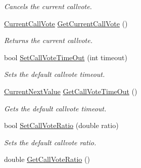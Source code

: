 \begin{DoxyCompactItemize}
\begin{DoxyCompactList}\small\item\em Cancels the current callvote. \end{DoxyCompactList}\item 
\hypertarget{classMethods_a8d457dcbd12a94aaf5d9913210e0862d}{\hyperlink{structCurrentCallVote}{Current\-Call\-Vote} \hyperlink{classMethods_a8d457dcbd12a94aaf5d9913210e0862d}{Get\-Current\-Call\-Vote} ()}\label{classMethods_a8d457dcbd12a94aaf5d9913210e0862d}

\begin{DoxyCompactList}\small\item\em Returns the current callvote. \end{DoxyCompactList}\item 
bool \hyperlink{classMethods_a9aaf00756eb3ee0e0a28e0c428bcc92d}{Set\-Call\-Vote\-Time\-Out} (int timeout)
\begin{DoxyCompactList}\small\item\em Sets the default callvote timeout. \end{DoxyCompactList}\item 
\hypertarget{classMethods_ac3ce6c4a44f8848c91395dc17c63a06f}{\hyperlink{structCurrentNextValue}{Current\-Next\-Value} \hyperlink{classMethods_ac3ce6c4a44f8848c91395dc17c63a06f}{Get\-Call\-Vote\-Time\-Out} ()}\label{classMethods_ac3ce6c4a44f8848c91395dc17c63a06f}

\begin{DoxyCompactList}\small\item\em Gets the default callvote timeout. \end{DoxyCompactList}\item 
bool \hyperlink{classMethods_a8e74a855649f8d1608fa8d873779189b}{Set\-Call\-Vote\-Ratio} (double ratio)
\begin{DoxyCompactList}\small\item\em Sets the default callvote ratio. \end{DoxyCompactList}\item 
\hypertarget{classMethods_a2279c611672e3ec5816780d661469d2a}{double \hyperlink{classMethods_a2279c611672e3ec5816780d661469d2a}{Get\-Call\-Vote\-Ratio} ()}\label{classMethods_a2279c611672e3ec5816780d661469d2a}


\end{DoxyCompactItemize}
